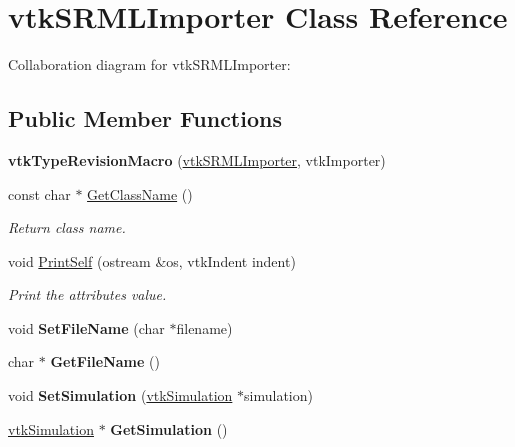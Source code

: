 \hypertarget{classvtkSRMLImporter}{
\section{vtkSRMLImporter Class Reference}
\label{classvtkSRMLImporter}
}
Collaboration diagram for vtkSRMLImporter:\subsection*{Public Member Functions}
\begin{DoxyCompactItemize}
\item 
\hypertarget{classvtkSRMLImporter_a55112c27f26ed582ed654c2e0c44a8b5}{
{\bfseries vtkTypeRevisionMacro} (\hyperlink{classvtkSRMLImporter}{vtkSRMLImporter}, vtkImporter)}
\label{classvtkSRMLImporter_a55112c27f26ed582ed654c2e0c44a8b5}

\item 
\hypertarget{classvtkSRMLImporter_a6e6898f0899fa2de4029cb6ab7b4f911}{
const char $\ast$ \hyperlink{classvtkSRMLImporter_a6e6898f0899fa2de4029cb6ab7b4f911}{GetClassName} ()}
\label{classvtkSRMLImporter_a6e6898f0899fa2de4029cb6ab7b4f911}

\begin{DoxyCompactList}\small\item\em Return class name. \item\end{DoxyCompactList}\item 
\hypertarget{classvtkSRMLImporter_a62d3aa1a2a9441077b1d3569f9f69e03}{
void \hyperlink{classvtkSRMLImporter_a62d3aa1a2a9441077b1d3569f9f69e03}{PrintSelf} (ostream \&os, vtkIndent indent)}
\label{classvtkSRMLImporter_a62d3aa1a2a9441077b1d3569f9f69e03}

\begin{DoxyCompactList}\small\item\em Print the attributes value. \item\end{DoxyCompactList}\item 
\hypertarget{classvtkSRMLImporter_aab5e7b3ce67f1c7de8d7c7558416d879}{
void {\bfseries SetFileName} (char $\ast$filename)}
\label{classvtkSRMLImporter_aab5e7b3ce67f1c7de8d7c7558416d879}

\item 
\hypertarget{classvtkSRMLImporter_ade5dc137bb6978aae3d0597e33290c70}{
char $\ast$ {\bfseries GetFileName} ()}
\label{classvtkSRMLImporter_ade5dc137bb6978aae3d0597e33290c70}

\item 
\hypertarget{classvtkSRMLImporter_af48e96fae89287bed52774aa94155f1b}{
void {\bfseries SetSimulation} (\hyperlink{classvtkSimulation}{vtkSimulation} $\ast$simulation)}
\label{classvtkSRMLImporter_af48e96fae89287bed52774aa94155f1b}

\item 
\hypertarget{classvtkSRMLImporter_a98df8b0a01a661642e2a83d77fbf293c}{
\hyperlink{classvtkSimulation}{vtkSimulation} $\ast$ {\bfseries GetSimulation} ()}
\label{classvtkSRMLImporter_a98df8b0a01a661642e2a83d77fbf293c}

\end{DoxyCompactItemize}
